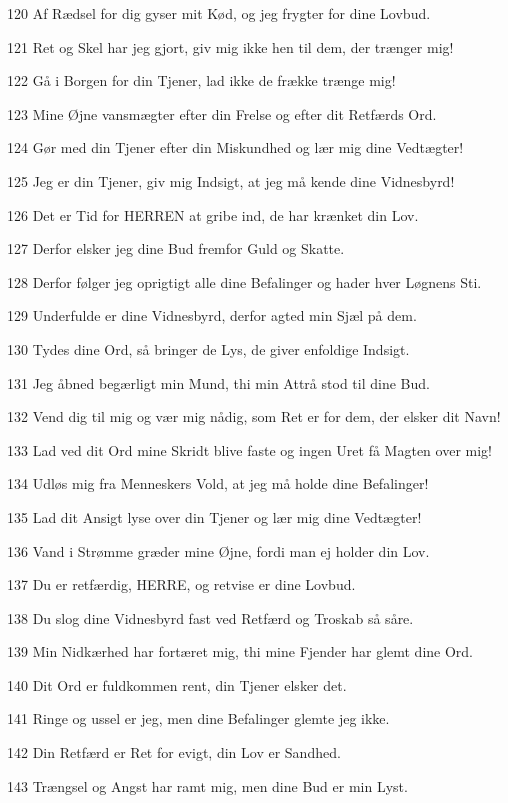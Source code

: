 \par 120 Af Rædsel for dig gyser mit Kød, og jeg frygter for dine Lovbud.
\par 121 Ret og Skel har jeg gjort, giv mig ikke hen til dem, der trænger mig!
\par 122 Gå i Borgen for din Tjener, lad ikke de frække trænge mig!
\par 123 Mine Øjne vansmægter efter din Frelse og efter dit Retfærds Ord.
\par 124 Gør med din Tjener efter din Miskundhed og lær mig dine Vedtægter!
\par 125 Jeg er din Tjener, giv mig Indsigt, at jeg må kende dine Vidnesbyrd!
\par 126 Det er Tid for HERREN at gribe ind, de har krænket din Lov.
\par 127 Derfor elsker jeg dine Bud fremfor Guld og Skatte.
\par 128 Derfor følger jeg oprigtigt alle dine Befalinger og hader hver Løgnens Sti.
\par 129 Underfulde er dine Vidnesbyrd, derfor agted min Sjæl på dem.
\par 130 Tydes dine Ord, så bringer de Lys, de giver enfoldige Indsigt.
\par 131 Jeg åbned begærligt min Mund, thi min Attrå stod til dine Bud.
\par 132 Vend dig til mig og vær mig nådig, som Ret er for dem, der elsker dit Navn!
\par 133 Lad ved dit Ord mine Skridt blive faste og ingen Uret få Magten over mig!
\par 134 Udløs mig fra Menneskers Vold, at jeg må holde dine Befalinger!
\par 135 Lad dit Ansigt lyse over din Tjener og lær mig dine Vedtægter!
\par 136 Vand i Strømme græder mine Øjne, fordi man ej holder din Lov.
\par 137 Du er retfærdig, HERRE, og retvise er dine Lovbud.
\par 138 Du slog dine Vidnesbyrd fast ved Retfærd og Troskab så såre.
\par 139 Min Nidkærhed har fortæret mig, thi mine Fjender har glemt dine Ord.
\par 140 Dit Ord er fuldkommen rent, din Tjener elsker det.
\par 141 Ringe og ussel er jeg, men dine Befalinger glemte jeg ikke.
\par 142 Din Retfærd er Ret for evigt, din Lov er Sandhed.
\par 143 Trængsel og Angst har ramt mig, men dine Bud er min Lyst.
